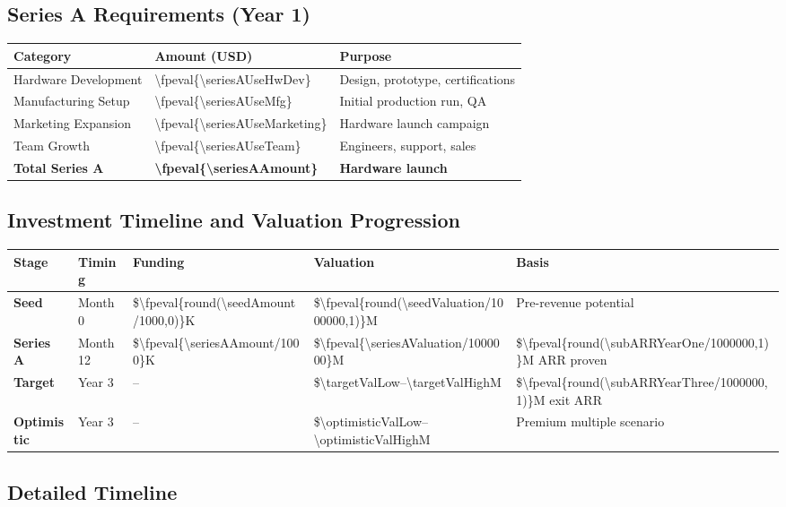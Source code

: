 \documentclass[11pt]{article}
\newcommand{\numfpeval}[1]{\num{\fpeval{#1}}}
\newcommand{\numint}[1]{\num[round-precision=0]{\fpeval{#1}}}
\begin{document}
\subsection{Series A Requirements (Year 1)}
\begin{table}[H]
\centering
\begin{tabularx}{\linewidth}{l Y Y}
\toprule
Category & Amount (USD) & Purpose \\\midrule
Hardware Development\cite{ycombinator2022} & \numint{\seriesAUseHwDev} & Design, prototype, certifications \\
Manufacturing Setup & \numint{\seriesAUseMfg} & Initial production run, QA \\
Marketing Expansion & \numint{\seriesAUseMarketing} & Hardware launch campaign \\
Team Growth & \numint{\seriesAUseTeam} & Engineers, support, sales \\
\textbf{Total Series A} & \textbf{\numint{\seriesAAmount}} & \textbf{Hardware launch} \\
\bottomrule
\end{tabularx}
\end{table}

\subsection{Investment Timeline and Valuation Progression}
\begin{table}[H]
\centering
\begin{tabularx}{\linewidth}{l Y Y Y Y}
\toprule
Stage & Timing & Funding & Valuation & Basis \\\midrule
\textbf{Seed} & Month 0 & \$\numint{round(\seedAmount/1000,0)}K & \$\numfpeval{round(\seedValuation/1000000,1)}M & Pre-revenue potential \\
\textbf{Series A} & Month 12 & \$\numint{\seriesAAmount/1000}K & \$\numfpeval{\seriesAValuation/1000000}M & \$\numfpeval{round(\subARRYearOne/1000000,1)}M ARR proven \\
\textbf{Target} & Year 3 & -- & \$\num{\targetValLow}--\num{\targetValHigh}M & \$\numfpeval{round(\subARRYearThree/1000000,1)}M exit ARR \\
\textbf{Optimistic} & Year 3 & -- & \$\num{\optimisticValLow}--\num{\optimisticValHigh}M & Premium multiple scenario \\
\bottomrule
\end{tabularx}
\end{table}

\subsection{Detailed Timeline}
\end{document}
